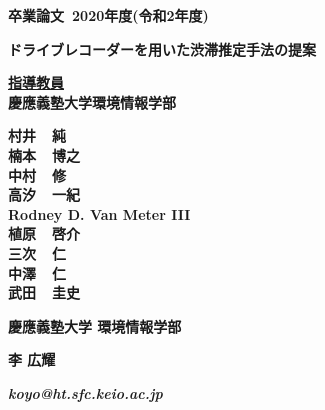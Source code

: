 \pagestyle{empty}

\begin{center}

\vspace{5cm}

\textbf{\Large 卒業論文~2020年度(令和2年度)}

\vspace{2cm}

\textbf{\LARGE ドライブレコーダーを用いた渋滞推定手法の提案}

\vspace{3cm}

\textbf{\underline{\large 指導教員}}\\
\textbf{慶應義塾大学環境情報学部}

\textbf{\Large 村井~~純}\\
\textbf{\Large 楠本~~博之}\\
\textbf{\Large 中村~~修}\\
\textbf{\Large 高汐~~一紀}\\
\textbf{\Large Rodney D. Van Meter III}\\
\textbf{\Large 植原~~啓介}\\
\textbf{\Large 三次~~仁}\\
\textbf{\Large 中澤~~仁}\\
\textbf{\Large 武田~~圭史}\\

\vspace{6cm}

\textbf{\LARGE 慶應義塾大学 環境情報学部}

\vspace{.5em}

\textbf{\LARGE 李 広耀}

\vspace{.3em}

\textbf{\it koyo@ht.sfc.keio.ac.jp}

\newpage

\end{center}

\pagestyle{plain}
